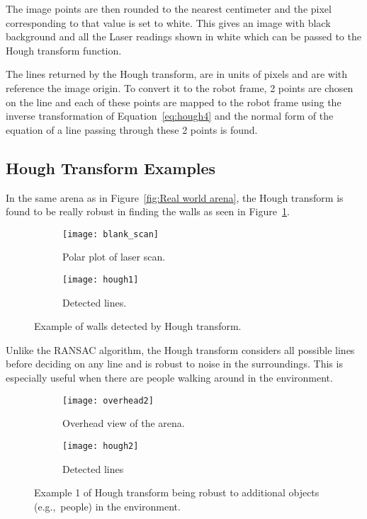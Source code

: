 The image points are then rounded to the nearest centimeter and the pixel corresponding to that value is set to white. This gives an image with black background and all the Laser readings shown in white which can be passed to the Hough transform function.

 
The lines returned by the Hough transform, are in units of pixels and are with reference the image origin. To convert it to the robot frame, 2 points are chosen on the line and each of these points are mapped to the robot frame using the inverse transformation of Equation~\ref{eq:hough4} and the normal form of the equation of a line passing through these 2 points is found. 

\subsection{Hough Transform Examples}
In the same arena as in Figure~\ref{fig:Real world arena}, the Hough transform is found to be really robust in finding the walls as seen in Figure~\ref{fig: hough1}.
 \begin{figure}[h!]
     \centering
     \begin{subfigure}[b]{0.45\textwidth}
     
 	    \texttt{[image: blank\_scan]}
         \caption{Polar plot of laser scan.}
     \end{subfigure}
     \quad %
     \begin{subfigure}[b]{0.45\textwidth}
         \texttt{[image: hough1]}
		 \caption{Detected lines.}
     \end{subfigure}%
         \caption{Example of walls detected by Hough transform.}
         \label{fig: hough1}
 \end{figure}

Unlike the RANSAC algorithm, the Hough transform considers all possible lines before deciding on any line and is robust to noise in the surroundings. This is especially useful when there are people walking around in the environment.
 \begin{figure}[h!]
     \centering
     \begin{subfigure}[b]{0.45\textwidth}
     
 	    \texttt{[image: overhead2]}
         \caption{Overhead view of the arena.}
     \end{subfigure}
     \quad %
     \begin{subfigure}[b]{0.45\textwidth}
         \texttt{[image: hough2]}
		 \caption{Detected lines}
     \end{subfigure}%
         \caption{Example 1 of Hough transform being robust to additional objects (e.g.,\ people) in the environment.} 
         \label{fig: hough2}
 \end{figure}
 
